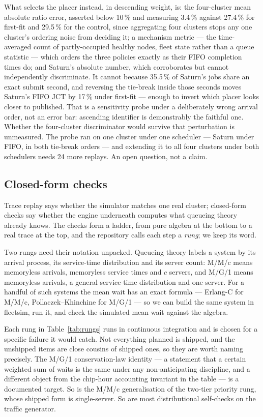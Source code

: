 What selects the placer instead, in descending weight, is: the four-cluster mean
absolute ratio error, asserted below 10\,\% and measuring 3.4\,\% against
27.4\,\% for first-fit and 29.5\,\% for the control, since aggregating four
clusters stops any one cluster's ordering noise from deciding it; a mechanism
metric --- the time-averaged count of partly-occupied healthy nodes, fleet state
rather than a queue statistic --- which orders the three policies exactly as
their FIFO completion times do; and Saturn's absolute number, which corroborates
but cannot independently discriminate. It cannot because 35.5\,\% of Saturn's
jobs share an exact submit second, and reversing the tie-break inside those
seconds moves Saturn's FIFO JCT by 17\,\% under first-fit --- enough to invert
which placer looks closer to published. That is a sensitivity probe under a
deliberately wrong arrival order, not an error bar: ascending identifier is
demonstrably the faithful one. Whether the four-cluster discriminator would
survive that perturbation is unmeasured. The probe ran on one cluster under one
scheduler --- Saturn under FIFO, in both tie-break orders --- and extending it
to all four clusters under both schedulers needs 24 more replays. An open
question, not a claim.

\subsection{Closed-form checks}
\label{sec:closed-form}

Trace replay says whether the simulator matches one real cluster; closed-form
checks say whether the engine underneath computes what queueing theory already
knows. The checks form a ladder, from pure algebra at the bottom to a real trace
at the top, and the repository calls each step a \emph{rung}; we keep its word.

Two rungs need their notation unpacked. Queueing theory labels a system by its
arrival process, its service-time distribution and its server count: M/M/c means
memoryless arrivals, memoryless service times and $c$ servers, and M/G/1 means
memoryless arrivals, a general service-time distribution and one server. For a
handful of such systems the mean wait has an exact formula --- Erlang-C for
M/M/c, Pollaczek--Khinchine for M/G/1 --- so we can build the same system in
fleetsim, run it, and check the simulated mean wait against the algebra.

Each rung in Table~\ref{tab:rungs} runs in continuous integration and is chosen
for a specific failure it would catch. Not everything planned is shipped, and
the unshipped items are close cousins of shipped ones, so they are worth naming
precisely. The M/G/1 conservation-law identity --- a statement that a certain
weighted sum of waits is the same under any non-anticipating discipline, and a
different object from the chip-hour accounting invariant in the table --- is a
documented target. So is the M/M/c generalisation of the two-tier priority rung,
whose shipped form is single-server. So are most distributional self-checks on
the traffic generator.

